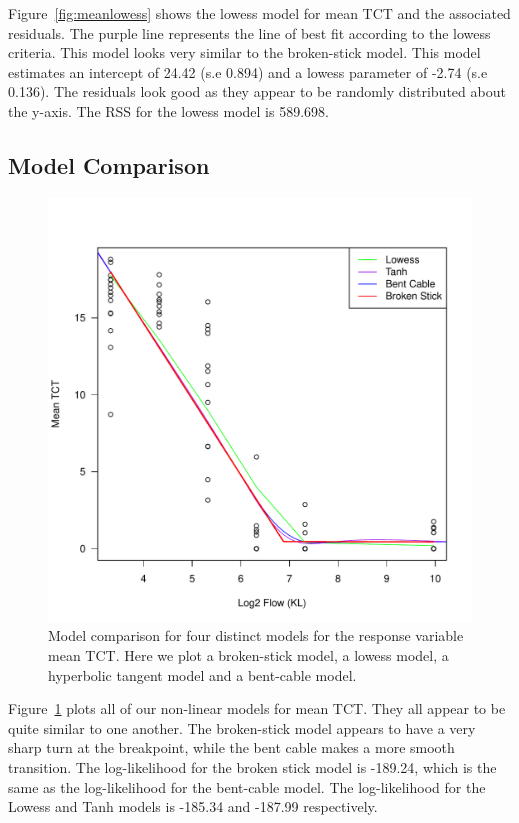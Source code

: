Figure~\ref{fig:meanlowess} shows the lowess model for mean TCT and the associated residuals. The purple line represents the line of best fit according to the lowess criteria. This model looks very similar to the broken-stick model. This model estimates an intercept of 24.42 (s.e 0.894) and a lowess parameter of -2.74 (s.e 0.136). The residuals look good as they appear to be randomly distributed about the y-axis. The RSS for the lowess model is 589.698.




\newpage

\subsection{Model Comparison}

\begin{figure}[H]
\includegraphics[scale=0.9]{Chapter4Images/meanTCTmodelcomparison.pdf}
\caption{Model comparison for four distinct models for the response variable mean TCT. Here we plot a broken-stick model, a lowess model, a hyperbolic tangent model and a bent-cable model.}
\label{fig:modelcomparison}
\end{figure}

Figure~\ref{fig:modelcomparison} plots all of our non-linear models for mean TCT. They all appear to be quite similar to one another. The broken-stick model appears to have a very sharp turn at the breakpoint, while the bent cable makes a more smooth transition.  The log-likelihood for the broken stick model is -189.24, which is the same as the log-likelihood for the bent-cable model. The log-likelihood for the Lowess and Tanh models is -185.34 and -187.99 respectively.


